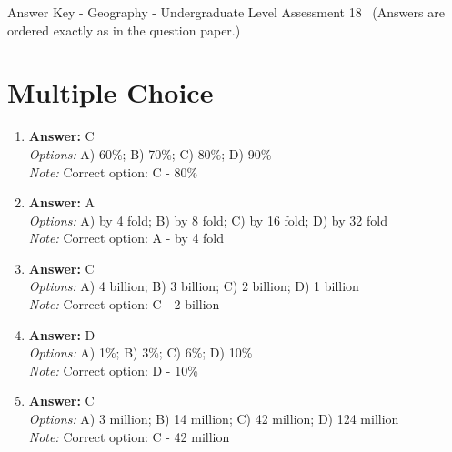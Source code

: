 \documentclass[12pt]{article}
\begin{document}
\begin{center}
Answer Key - Geography - Undergraduate Level Assessment 18 \
\small (Answers are ordered exactly as in the question paper.)
\end{center}

\section*{Multiple Choice}
\begin{enumerate}[label=\arabic*.]
\item \textbf{Answer:} C
\\ \textit{Options:} A) 60\%; B) 70\%; C) 80\%; D) 90\%
\\ \textit{Note:} Correct option: C - 80\%
\item \textbf{Answer:} A
\\ \textit{Options:} A) by 4 fold; B) by 8 fold; C) by 16 fold; D) by 32 fold
\\ \textit{Note:} Correct option: A - by 4 fold
\item \textbf{Answer:} C
\\ \textit{Options:} A) 4 billion; B) 3 billion; C) 2 billion; D) 1 billion
\\ \textit{Note:} Correct option: C - 2 billion
\item \textbf{Answer:} D
\\ \textit{Options:} A) 1\%; B) 3\%; C) 6\%; D) 10\%
\\ \textit{Note:} Correct option: D - 10\%
\item \textbf{Answer:} C
\\ \textit{Options:} A) 3 million; B) 14 million; C) 42 million; D) 124 million
\\ \textit{Note:} Correct option: C - 42 million
\end{enumerate}
\end{document}
